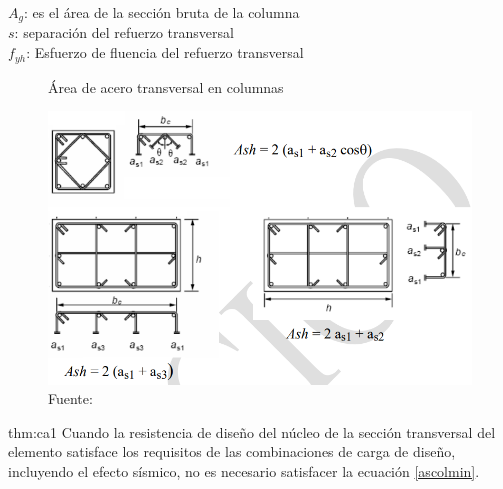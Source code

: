$A_{g}$: es el área de la sección bruta de la columna\\
$s$: separación del refuerzo transversal\\
$f_{yh}$: Esfuerzo de fluencia del refuerzo transversal
\begin{figure}[h!]
    \centering
    \caption{Área de acero transversal en columnas}
    \includegraphics[scale=0.67]{IMAGENES/cc3.PNG}
    \caption*{\small Fuente: \it \cite{E-060}}
    \label{atrans}
\end{figure}
\newpage
\begin{theo}[Art. 21.6.4.1 (c) E-060 :]{thm:ca1}
Cuando la resistencia de diseño del núcleo de la sección transversal del elemento satisface los requisitos de las combinaciones de carga de diseño, incluyendo el efecto sísmico, no es necesario satisfacer la ecuación \ref{ascolmin}.
\end{theo}

